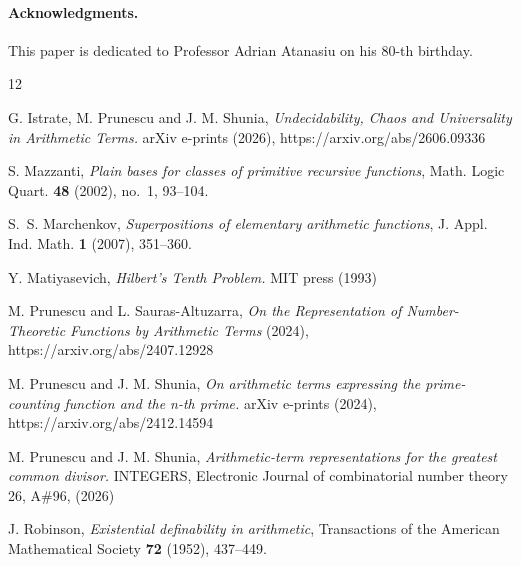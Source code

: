 \documentclass[10pt,a4paper]{article}
\theoremstyle{plain}
\begin{document}
\paragraph*{Acknowledgments.} This paper is dedicated to Professor Adrian Atanasiu on his 80-th birthday. 

\begin{thebibliography}{12} 

 G. Istrate, M. Prunescu and J. M. Shunia, \emph{Undecidability, Chaos and Universality in Arithmetic Terms.} arXiv e-prints (2026),
https://arxiv.org/abs/2606.09336

 S. Mazzanti,
\emph{Plain bases for classes of primitive recursive functions}, Math. Logic Quart. \textbf{48} (2002), no.~1, 93--104.

 S.~S. Marchenkov,
\emph{Superpositions of elementary arithmetic functions},
J. Appl. Ind. Math. \textbf{1} (2007), 351--360.

 Y. Matiyasevich, \emph{Hilbert’s Tenth Problem.} MIT press (1993)

 M. Prunescu and L. Sauras-Altuzarra, \emph{On the Representation of Number-Theoretic Functions by Arithmetic Terms} (2024),
https://arxiv.org/abs/2407.12928

 M. Prunescu and J. M. Shunia, \emph{On arithmetic terms expressing the prime-counting function and the n-th prime.} arXiv e-prints (2024),
https://arxiv.org/abs/2412.14594 

 M. Prunescu and J. M. Shunia, \emph{Arithmetic-term representations for the
greatest common divisor.} INTEGERS, Electronic Journal of combinatorial number theory 26, A\#96, (2026)

 J. Robinson,
\emph{Existential definability in arithmetic},
Transactions of the American Mathematical Society \textbf{72} (1952), 437--449.

\end{thebibliography}
\end{document}
